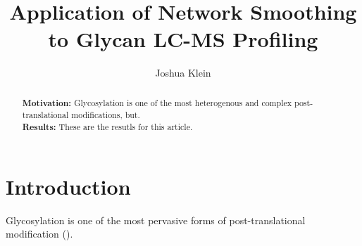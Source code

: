 \documentclass{article}
\begin{document}
\newcommand{\monosaccharide}[1]{{\bf #1}}
\newcommand{\nglycan}[0]{\textit{N}-glycan }
\newcommand{\nglycans}[0]{\textit{N}-glycans }

\newcommand{\msn}[0]{$MS^n$}

\newcommand{\agp}[0]{\textit{20150930-06-AGP} }
\newcommand{\phil}[0]{\textit{20141031-07-Phil-82} }
\newcommand{\philbs}[0]{\textit{20141101-04-Phil-BS} }
\newcommand{\igg}[0]{\textit{20151002-02-IGG} }
\newcommand{\dpphil}[0]{\textit{20141128-11-Phil-82} }
\newcommand{\dpagp}[0]{\textit{AGP-DR-Perm-glycans-1} }
\newcommand{\rpagp}[0]{\textit{AGP-permethylated-2ul-inj-55-SLens} }
\newcommand{\rphumanserum}[0]{\textit{Perm-BS-070111-04-Human-Serum} }


\title{Application of Network Smoothing to Glycan LC-MS Profiling}
\author{Joshua Klein}
\begin{abstract}
    \textbf{Motivation:} Glycosylation is one of the most heterogenous
    and complex post-translational modifications, but.\\
    \textbf{Results:} These are the resutls for this article.\\
\end{abstract}

\maketitle

\section{Introduction}
Glycosylation is one of the most pervasive forms of post-translational
modification (\cite{Varki2017}).


% 



% 




\end{document}
